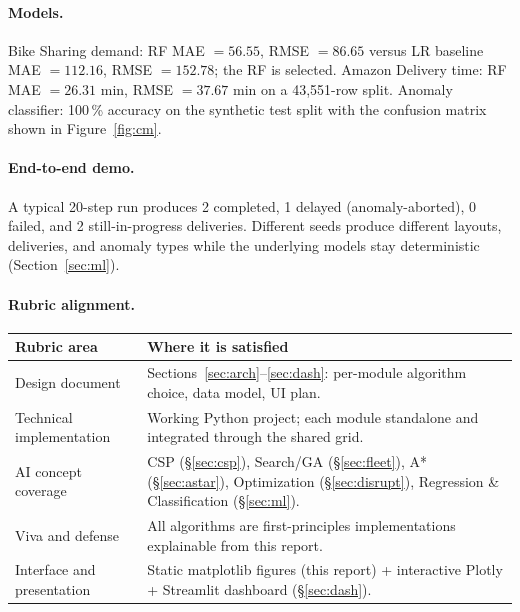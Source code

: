\documentclass[11pt,a4paper]{article}
\begin{document}
\paragraph{Models.} Bike Sharing demand: RF MAE $= 56.55$, RMSE $= 86.65$
versus LR baseline MAE $= 112.16$, RMSE $= 152.78$; the RF is selected.
Amazon Delivery time: RF MAE $= 26.31$ min, RMSE $= 37.67$ min on a
43{,}551-row split. Anomaly classifier: 100\,\% accuracy on the synthetic
test split with the confusion matrix shown in Figure~\ref{fig:cm}.

\paragraph{End-to-end demo.} A typical 20-step run produces 2 completed,
1 delayed (anomaly-aborted), 0 failed, and 2 still-in-progress deliveries.
Different seeds produce different layouts, deliveries, and anomaly types
while the underlying models stay deterministic (Section~\ref{sec:ml}).

\paragraph{Rubric alignment.}
\begin{table}[H]
\centering
\begin{tabular}{@{}p{4cm}p{10cm}@{}}
\toprule
\textbf{Rubric area}      & \textbf{Where it is satisfied} \\
\midrule
Design document            & Sections~\ref{sec:arch}--\ref{sec:dash}: per-module algorithm choice, data model, UI plan. \\
Technical implementation   & Working Python project; each module standalone and integrated through the shared grid. \\
AI concept coverage        & CSP (\S\ref{sec:csp}), Search/GA (\S\ref{sec:fleet}), A* (\S\ref{sec:astar}), Optimization (\S\ref{sec:disrupt}), Regression \& Classification (\S\ref{sec:ml}). \\
Viva and defense           & All algorithms are first-principles implementations explainable from this report. \\
Interface and presentation & Static matplotlib figures (this report) + interactive Plotly + Streamlit dashboard (\S\ref{sec:dash}). \\
\bottomrule
\end{tabular}
\end{table}

\end{document}
